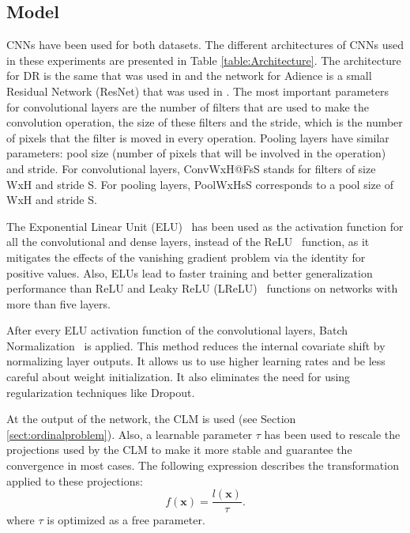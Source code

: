 \documentclass[preprint]{elsarticle}
\begin{document}
\subsection{Model}
\label{sect:model}
CNNs have been used for both datasets. The different architectures of CNNs used in these experiments are presented in Table \ref{table:Architecture}. The architecture for DR is the same that was used in \cite{de2018weighted} and the network for Adience is a small Residual Network (ResNet) \cite{he2016deep} that was used in \cite{beckham2017unimodal}. The most important parameters for convolutional layers are the number of filters that are used to make the convolution operation, the size of these filters and the stride, which is the number of pixels that the filter is moved in every operation. Pooling layers have similar parameters: pool size (number of pixels that will be involved in the operation) and stride. For convolutional layers, ConvWxH@FsS stands for filters of size WxH and stride S. For pooling layers, PoolWxHsS corresponds to a pool size of WxH and stride S.

The Exponential Linear Unit (ELU)~\cite{clevert2015fast} has been used as the activation function for all the convolutional and dense layers, instead of the ReLU~\cite{nair2010rectified} function, as it mitigates the effects of the vanishing gradient problem \cite{bengio1994learning,pascanu2013difficulty} via the identity for positive values. Also, ELUs lead to faster training and better generalization performance than ReLU and Leaky ReLU (LReLU)~\cite{maas2013rectifier} functions on networks with more than five layers.

After every ELU activation function of the convolutional layers, Batch Normalization~\cite{ioffe2015batch} is applied. This method reduces the internal covariate shift by normalizing layer outputs. It allows us to use higher learning rates and be less careful about weight initialization. It also eliminates the need for using regularization techniques like Dropout.

At the output of the network, the CLM is used (see Section \ref{sect:ordinalproblem}). Also, a learnable parameter $\tau$ has been used to rescale the projections used by the CLM to make it more stable and guarantee the convergence in most cases. The following expression describes the transformation applied to these projections:
\begin{equation}
\nonumber
f(\mathbf{x}) = \frac{l(\mathbf{x})}{\tau}.
\end{equation}
where $\tau$ is optimized as a free parameter.
\end{document}
